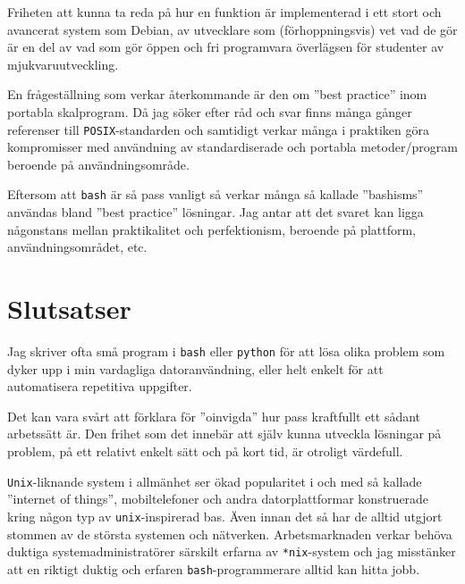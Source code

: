 Friheten att kunna ta reda på hur en funktion är implementerad i ett stort och
avancerat system som Debian, av utvecklare som (förhoppningsvis) vet vad de gör
är en del av vad som gör öppen och fri programvara överlägsen för studenter av
mjukvaruutveckling.

En frågeställning som verkar återkommande är den om ''best practice'' inom
portabla skalprogram. Då jag söker efter råd och svar finns många gånger
referenser till \texttt{POSIX}-standarden \cite{IEEE:2001:ISRa,
IEEE:2001:ISRb, IEEE:2001:ISRc, IEEE:2001:ISRd} och samtidigt
verkar många i praktiken göra kompromisser med användning av standardiserade
och portabla metoder/program beroende på användningsområde.

Eftersom att \texttt{bash} är så pass vanligt så verkar många så kallade
''bashisms'' \cite{misc:bashism} användas bland ''best practice'' lösningar.
Jag antar att det svaret kan ligga någonstans mellan praktikalitet och
perfektionism, beroende på plattform, användningsområdet, etc.


\section{Slutsatser}
Jag skriver ofta små program i \texttt{bash} eller \texttt{python} för att lösa
olika problem som dyker upp i min vardagliga datoranvändning, eller helt enkelt
för att automatisera repetitiva uppgifter. 

Det kan vara svårt att förklara för ''oinvigda'' hur pass kraftfullt ett sådant
arbetssätt är.  Den frihet som det innebär att själv kunna utveckla lösningar
på problem, på ett relativt enkelt sätt och på kort tid, är otroligt värdefull. 

\texttt{Unix}-liknande system i allmänhet ser ökad popularitet i och med så
kallade ''internet of things'', mobiltelefoner och andra datorplattformar
konstruerade kring någon typ av \texttt{unix}-inspirerad bas. Även innan det så
har de alltid utgjort stommen av de största systemen och nätverken.
Arbetsmarknaden verkar behöva duktiga systemadministratörer särskilt erfarna av
\texttt{*nix}-system och jag misstänker att en riktigt duktig och erfaren
\texttt{bash}-programmerare alltid kan hitta jobb.
